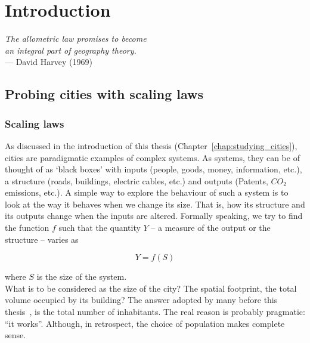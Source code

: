 \chapter{Introduction}
\label{chap:scaling_introduction}

\begin{flushright}{\slshape    
The allometric law promises to become\\
an integral part of geography theory.} \\ \medskip
--- David Harvey (1969)~\cite{Harvey:1969} 
\end{flushright}


\section{Probing cities with scaling laws}
\label{sec:probing_cities_with_scaling_laws}

\subsection{Scaling laws}
\label{sub:scaling_laws}

As discussed in the introduction of this thesis
(Chapter~\ref{chap:studying_cities}), cities are paradigmatic examples of
complex systems. As systems, they can be of thought of as `black boxes' with
inputs (people, goods, money, information, etc.), a structure (roads, buildings,
electric cables, etc.) and outputs (Patents, $CO_2$ emissions, etc.).  A simple
way to explore the behaviour of such a system is to look at the way it behaves
when we change its size. That is, how its structure and its outputs change when
the inputs are altered. Formally speaking, we try to find the function $f$ such
that the quantity $Y$ -- a measure of the output or the structure -- varies as

\begin{equation}
    Y = f(S)
    \label{eq:functional_form}
\end{equation}

where $S$ is the size of the system.\\ 


What is to be considered as the size of the city?  The spatial footprint, the
total volume occupied by its building? The answer adopted by many before this
thesis~\cite{Stewart:1947, Bettencourt:2007}, is the total number of
inhabitants. The real reason is probably pragmatic: ``it
works''. Although, in retrospect, the choice of population makes complete sense. 

